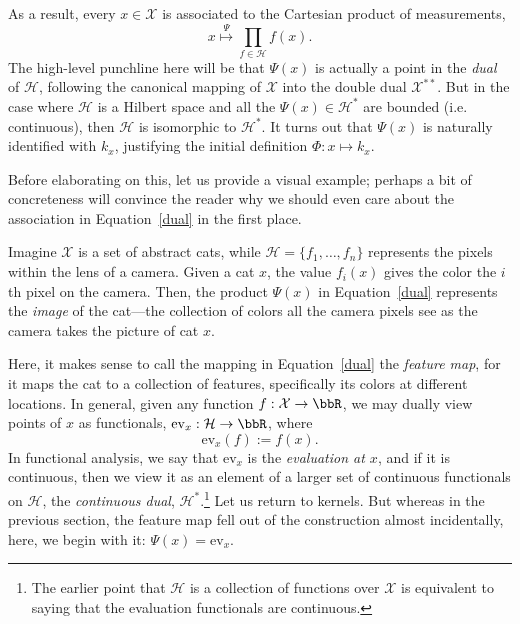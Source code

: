 \documentclass[twoside,11pt]{homework}
\begin{document}
As a result, every $x \in \mathcal{X}$ is associated to the Cartesian product of measurements,
\begin{equation}\label{dual}
  x \overset{\Psi}{\mapsto}\prod_{f \in \mathcal{H}} f(x).
\end{equation}
The high-level punchline here will be that $\Psi(x)$ is actually a point in the \emph{dual} of $\mathcal{H}$, following the canonical mapping of $\mathcal{X}$ into the double dual $\mathcal{X}^{**}$. But in the case where $\mathcal{H}$ is a Hilbert space and all the $\Psi(x) \in \mathcal{H}^*$ are bounded (i.e. continuous), then $\mathcal{H}$ is isomorphic to $\mathcal{H}^*$. It turns out that $\Psi(x)$ is naturally identified with $k_x$, justifying the initial definition $\Phi : x \mapsto k_x$.

Before elaborating on this, let us provide a visual example; perhaps a bit of concreteness will convince the reader why we should even care about the association in Equation~\ref{dual} in the first place.

Imagine $\mathcal{X}$ is a set of abstract cats, while $\mathcal{H} = \{f_1,\dotsc, f_n\}$ represents the pixels within the lens of a camera. Given a cat $x$, the value $f_i(x)$ gives the color the $i$th pixel on the camera. Then, the product $\Psi(x)$ in Equation~\ref{dual} represents the \emph{image} of the cat---the collection of colors all the camera pixels see as the camera takes the picture of cat $x$.

Here, it makes sense to call the mapping in Equation~\ref{dual} the \emph{feature map}, for it maps the cat to a collection of features, specifically its colors at different locations. In general, given any function $f : \mathcal{X} \to \bbR$, we may dually view points of $x$ as functionals, $\mathrm{ev}_x : \mathcal{H} \to \bbR$, where
\[\mathrm{ev}_x(f) := f(x).\]
In functional analysis, we say that $\mathrm{ev}_x$ is the \emph{evaluation at $x$}, and if it is continuous, then we view it as an element of a larger set of continuous functionals on $\mathcal{H}$, the \emph{continuous dual}, $\mathcal{H}^*$.\footnote{The earlier point that $\mathcal{H}$ is a collection of functions over $\mathcal{X}$ is equivalent to saying that the evaluation functionals are continuous.} Let us return to kernels. But whereas in the previous section, the feature map fell out of the construction almost incidentally, here, we begin with it: $\Psi(x) = \mathrm{ev}_x$.
\end{document}
